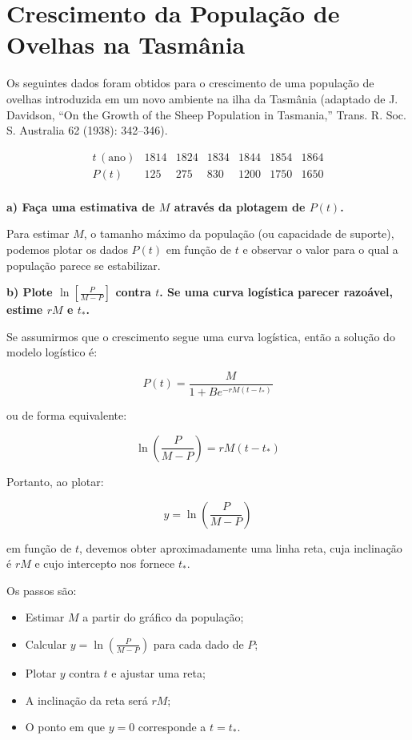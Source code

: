 \documentclass{article}
\begin{document}
\section*{Crescimento da População de Ovelhas na Tasmânia}

Os seguintes dados foram obtidos para o crescimento de uma população de ovelhas introduzida em um novo ambiente na ilha da Tasmânia (adaptado de J. Davidson, ``On the Growth of the Sheep Population in Tasmania,'' Trans. R. Soc. S. Australia 62 (1938): 342--346).

\[
\begin{array}{c|ccccccc}
t \, (\text{ano}) & 1814 & 1824 & 1834 & 1844 & 1854 & 1864 \\
\hline
P(t) & 125 & 275 & 830 & 1200 & 1750 & 1650 \\
\end{array}
\]

\bigskip

\textbf{a) Faça uma estimativa de $M$ através da plotagem de $P(t)$.}

Para estimar $M$, o tamanho máximo da população (ou capacidade de suporte), podemos plotar os dados $P(t)$ em função de $t$ e observar o valor para o qual a população parece se estabilizar.

\bigskip

\textbf{b) Plote $\ln \left[ \frac{P}{M - P} \right]$ contra $t$. Se uma curva logística parecer razoável, estime $rM$ e $t_*$.}

Se assumirmos que o crescimento segue uma curva logística, então a solução do modelo logístico é:

\[
P(t) = \frac{M}{1 + B e^{-r M (t - t_*)}}
\]

ou de forma equivalente:

\[
\ln \left( \frac{P}{M - P} \right) = r M (t - t_*) 
\]

Portanto, ao plotar:

\[
y = \ln \left( \frac{P}{M - P} \right)
\]

em função de $t$, devemos obter aproximadamente uma linha reta, cuja inclinação é $rM$ e cujo intercepto nos fornece $t_*$. 

Os passos são:
\begin{itemize}
    \item Estimar $M$ a partir do gráfico da população;
    \item Calcular $y = \ln \left( \frac{P}{M - P} \right)$ para cada dado de $P$;
    \item Plotar $y$ contra $t$ e ajustar uma reta;
    \item A inclinação da reta será $rM$;
    \item O ponto em que $y = 0$ corresponde a $t = t_*$.
\end{itemize}
\end{document}
